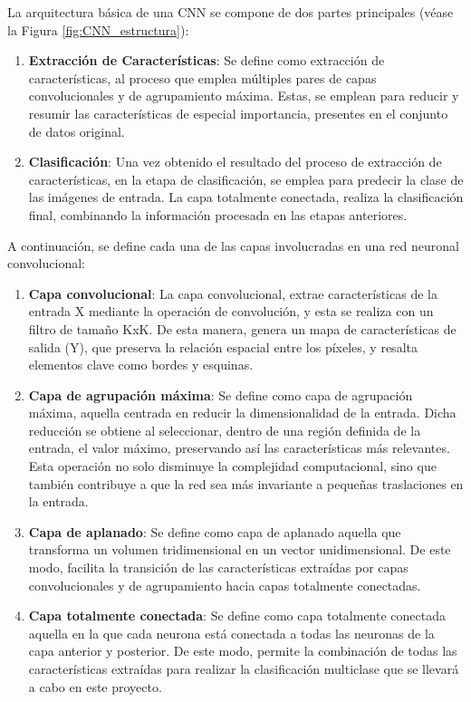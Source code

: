 La arquitectura básica de una CNN se compone de dos partes principales (véase la Figura \ref{fig:CNN_estructura}):

\begin{enumerate} [label=\textbullet]
	\item \textbf{Extracción de Características}: Se define como extracción de características, al proceso que emplea múltiples pares de capas convolucionales y de agrupamiento máxima. Estas, se emplean para reducir y resumir las características de especial importancia, presentes en el conjunto de datos original.
	\item \textbf{Clasificación}: Una vez obtenido el resultado del proceso de extracción de características, en la etapa de clasificación, se emplea para predecir la clase de las imágenes de entrada. La capa totalmente conectada, realiza la clasificación final, combinando la información procesada en las etapas anteriores.
\end{enumerate}

A continuación, se define cada una de las capas involucradas en una red neuronal convolucional:

\begin{enumerate}[label=\textbullet]
	\item \textbf{Capa convolucional}: La capa convolucional, extrae características de la entrada X mediante la operación de convolución, y esta se realiza con un filtro de tamaño KxK. De esta manera, genera un mapa de características de salida (Y), que preserva la relación espacial entre los píxeles, y resalta elementos clave como bordes y esquinas.
	\item \textbf{Capa de agrupación máxima}: Se define como capa de agrupación máxima, aquella centrada en reducir la dimensionalidad de la entrada. Dicha reducción se obtiene al seleccionar, dentro de una región definida de la entrada, el valor máximo, preservando así las características más relevantes. Esta operación no solo disminuye la complejidad computacional, sino que también contribuye a que la red sea más invariante a pequeñas traslaciones en la entrada.
	\item \textbf{Capa de aplanado}: Se define como capa de aplanado aquella que transforma un volumen tridimensional en un vector unidimensional. De este modo, facilita la transición de las características extraídas por capas convolucionales y de agrupamiento hacia capas totalmente conectadas.
	\item \textbf{Capa totalmente conectada}: Se define como capa totalmente conectada aquella en la que cada neurona está conectada a todas las neuronas de la capa anterior y posterior. De este modo, permite la combinación de todas las características extraídas para realizar la clasificación multiclase que se llevará a cabo en este proyecto.
\end{enumerate}

